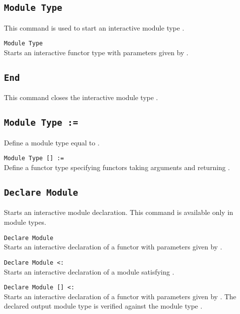 \subsection{\tt Module Type {\ident}}
This command is used to start an interactive module type {\ident}.

\begin{Variants}
\item{\tt Module Type \ident [\modbindings]}\\
  Starts an interactive functor type with parameters given by {\modbindings}.
\end{Variants}

\subsection{\tt End {\ident}}
This command closes the interactive module type {\ident}.

\begin{ErrMsgs}
\item {}
\end{ErrMsgs}

\subsection{\tt Module Type {\ident} := {\modtype}}
Define a module type {\ident} equal to {\modtype}.

\begin{Variants}
\item {\tt Module Type {\ident} [\modbindings] := {\modtype}} \\
  Define a functor type {\ident} specifying functors taking arguments
  {\modbindings} and returning {\modtype}.
\end{Variants}

\subsection{\tt Declare Module {\ident}}
Starts an interactive module declaration. This command is available
only in module types. 

\begin{Variants}
\item{\tt Declare Module \ident [\modbindings]}\\
  Starts an interactive declaration of a functor with parameters given
  by {\modbindings}.
\item{\tt Declare Module {\ident} \verb.<:. \modtype}\\
  Starts an interactive declaration of a module satisfying {\modtype}.
\item{\tt Declare Module {\ident} [\modbindings] \verb.<:. \modtype}\\
  Starts an interactive declaration of a functor with parameters given
  by {\modbindings}. The declared output module type is verified
  against the module type {\modtype}.
\end{Variants}

